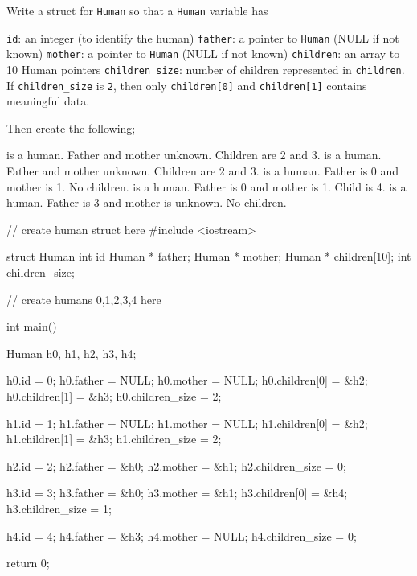 

\nextq
Write a struct for \verb!Human! so that a \verb!Human!
variable has
\begin{enumerate}[nosep]
\li \verb!id!: an integer (to identify the human)
\li \verb!father!: a pointer to \verb!Human! (NULL if not known)
\li \verb!mother!: a pointer to \verb!Human! (NULL if not known)
\li \verb!children!: an array to 10 Human pointers
\li \verb!children_size!: number of children represented in \verb!children!.
If \verb!children_size! is \verb!2!, then only
\verb!children[0]! and \verb!children[1]! contains meaningful data.
\end{enumerate}
Then create the following;
\begin{enumerate}
 is a human. Father and mother unknown. Children are 2 and 3.
 is a human. Father and mother unknown. Children are 2 and 3.
 is a human. Father is 0 and mother is 1. No children.
 is a human. Father is 0 and mother is 1. Child is 4.
 is a human. Father is 3 and mother is unknown. No children.
\end{enumerate}
\ANSWER
\begin{answercode}
// create human struct here
#include <iostream>

struct Human
{
  int id
  Human * father;
  Human * mother;
  Human * children[10];
  int children_size;
}

// create humans 0,1,2,3,4 here

int main()
{
  Human h0, h1, h2, h3, h4;

  h0.id = 0;
  h0.father = NULL;
  h0.mother = NULL;
  h0.children[0] = &h2;
  h0.children[1] = &h3;
  h0.children_size = 2;

  h1.id = 1;
  h1.father = NULL;
  h1.mother = NULL;
  h1.children[0] = &h2;
  h1.children[1] = &h3;
  h1.children_size = 2;

  h2.id = 2;
  h2.father = &h0;
  h2.mother = &h1;
  h2.children_size = 0;

  h3.id = 3;
  h3.father = &h0;
  h3.mother = &h1;
  h3.children[0] = &h4;
  h3.children_size = 1;

  h4.id = 4;
  h4.father = &h3;
  h4.mother = NULL;
  h4.children_size = 0;

  return 0;
}
\end{answercode}


